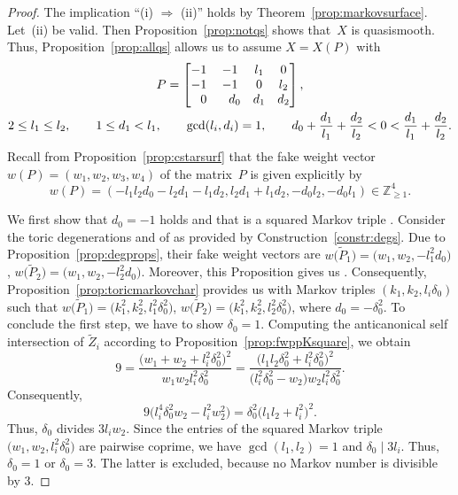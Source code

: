 \documentclass[10pt,a4paper]{amsart}
\theoremstyle{definition}
\def\ZZ{{\mathbb Z}}
\begin{document}
\begin{proof}
The implication ``(i) $\Rightarrow$ (ii)'' holds
by Theorem~\ref{prop:markovsurface}.
Let~(ii) be valid.
Then Proposition~\ref{prop:notqs} shows
that~$X$ is quasismooth.
Thus, Proposition~\ref{prop:allqs} allows us to
assume $X=X(P)$ with
\begin{gather*}
P
 =
\begin{bmatrix}
-1 & -1 & l_1 & 0
\\
-1 & -1 & 0 & l_2
\\
\hphantom{-} 0 & \hphantom{-}d_0 & d_1 & d_2
\end{bmatrix},
\\
2 \le l_1 \le l_2, \qquad 1 \le d_1 < l_1, \qquad \gcd(l_i,d_i) = 1,
\qquad
d_0 + \frac{d_1}{l_1} + \frac{d_2}{l_2} < 0 < \frac{d_1}{l_1} + \frac{d_2}{l_2}.
\end{gather*}
Recall from Proposition~\ref{prop:cstarsurf}
that the fake weight vector
$w(P)=(w_1,w_2,w_3,w_4)$
of the matrix~$P$ is given explicitly by
\[
w(P)
 =
(-l_1l_2d_0 - l_2d_1 - l_1d_2, l_2d_1 + l_1d_2, -d_0l_2, -d_0l_1)
 \in
\ZZ_{\ge 1}^4.
\]

We first show that $d_0=-1$ holds
and that  is a squared
Markov triple .
Consider the toric degenerations 
and  of  as provided by
Construction~\ref{constr:degs}.
Due to Proposition~\ref{prop:degprops},
their fake weight vectors are
$
w\bigl(\tilde P_1\bigr)
 =
\bigl(w_1, w_2, -l_1^2d_0\bigr)$,
$
w\bigl(\tilde P_2\bigr)
 =
\bigl(w_1, w_2, -l_2^2d_0\bigr)$.
Moreover, this Proposition gives us
.
Consequently, Proposition~\ref{prop:toricmarkovchar}
provides us with Markov triples
$(k_1,k_2,l_i\delta_0)$ such that
$
w\bigl(\tilde P_1\bigr)
 =
\bigl(k_1^2, k_2^2, l_1^2\delta_0^2\bigr)$,
$
w\bigl(\tilde P_2\bigr)
 =
\bigl(k_1^2, k_2^2, l_2^2\delta_0^2\bigr)$,
where $d_0 = - \delta_0^2$. To conclude the first step,
we have to show $\delta_0=1$.
Computing the anticanonical self intersection of $\tilde Z_i$
according to Proposition~\ref{prop:fwppKsquare}, we obtain
\[
9
 =
\frac{\bigl(w_1+w_2+l_i^2\delta_0^2\bigr)^2}{w_1 w_2 l_i^2\delta_0^2}
 =
\frac{\bigl(l_1l_2\delta_0^2+l_i^2\delta_0^2\bigr)^2}{\bigl(l_i^2\delta_0^2-w_2\bigr) w_2 l_i^2\delta_0^2}.
\]
Consequently,
\[
9\bigl(l_i^4\delta_0^2w_2 - l_i^2w_2^2\bigr)
 =
\delta_0^2\bigl(l_1l_2+l_i^2\bigr)^2.
\]
Thus, $\delta_0$ divides $3l_iw_2$.
Since the entries of the squared Markov triple
$\bigl(w_1,w_2,l_i^2\delta_0^2\bigr)$
are pairwise coprime, we have
$\gcd(l_1,l_2) = 1$ and $\delta_0 \mid 3l_i$.
Thus, $\delta_0=1$ or $\delta_0=3$.
The latter is excluded, because no Markov
number is divisible by 3.



\end{proof}
\end{document}
